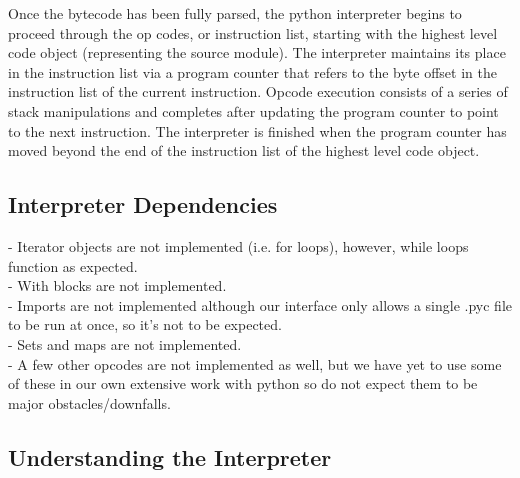 \documentclass{article}
\begin{document}
Once the bytecode has been fully parsed, the python interpreter begins to proceed through the op codes, or instruction list, starting with the highest level code object (representing the source module).  The interpreter maintains its place in the instruction list via a program counter that refers to the byte offset in the instruction list of the current instruction.  Opcode execution consists of a series of stack manipulations and completes after updating the program counter to point to the next instruction. The interpreter is finished when the program counter has moved beyond the end of the instruction list of the highest level code object.

\subsection{Interpreter Dependencies}

- Iterator objects are not implemented (i.e. for loops), however, while loops function as expected.\\
- With blocks are not implemented.\\
- Imports are not implemented although our interface only allows a single .pyc file to be run at once, so it's not to be expected.\\
- Sets and maps are not implemented.\\
- A few other opcodes are not implemented as well, but we have yet to use some of these in our own extensive work with python so do not expect them to be major obstacles/downfalls.

\subsection{Understanding the Interpreter}
\end{document}
